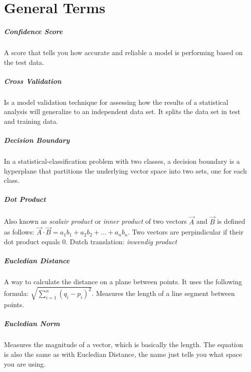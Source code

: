 \chapter{General Terms}\label{chap:general_terms}

\paragraph{Confidence Score} 
A score that tells you how accurate and reliable a model is performing based on the test data.

\paragraph{Cross Validation} 
Is a model validation technique for assessing how the results of a statistical analysis will generalize to an independent data set. It splits the data set in test and training data.

\paragraph{Decision Boundary}
In a statistical-classification problem with two classes, a decision boundary is a hyperplane that partitions the underlying vector space into two sets, one for each class.

\paragraph{Dot Product}
Also known as \emph{scalair product} or \emph{inner product} of two vectors $\vec{A}$ and $\vec{B}$ is defined as follows: $\vec{A} \cdot \vec{B} = a_1 b_1 + a_2 b_2 + ... + a_n b_n$. Two vectors are perpindicular if their dot product equals 0. Dutch translation: \emph{inwendig product}

\paragraph{Eucledian Distance}
A way to calculate the distance on a plane between points. It uses the following formula: $\sqrt{\sum\limits_{i=1}^n (q_{i} - p_{i})^2}$. Measures the length of a line segment between points.

\paragraph{Eucledian Norm}
Measures the magnitude of a vector, which is basically the length. The equation is also the same as with Eucledian Distance, the name just tells you what space you are using.

